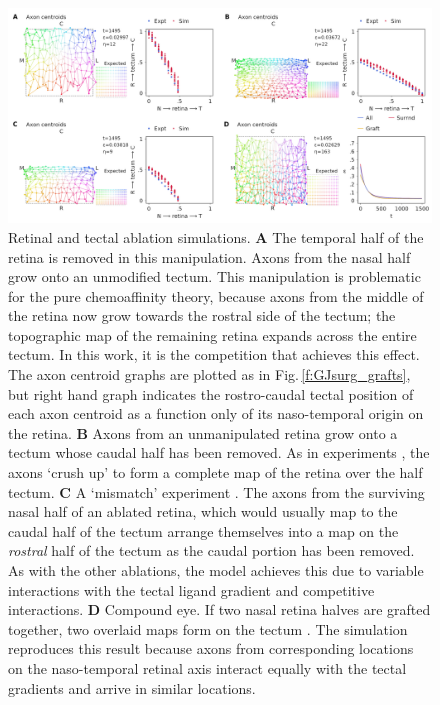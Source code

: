 \documentclass[9pt]{elife} %
\begin{document}
\begin{figure}
\begin{fullwidth}
\includegraphics[width=0.95\linewidth]{./images/fig_GJ_surgical_ablations.png}
\caption{Retinal and tectal ablation simulations. \textbf{A} The temporal half of the retina is removed in this manipulation. Axons from the nasal half grow onto an unmodified tectum. This manipulation is problematic for the pure chemoaffinity theory, because axons from the middle of the retina now grow towards the rostral side of the tectum; the topographic map of the remaining retina expands across the entire tectum. In this work, it is the competition that achieves this effect. The axon centroid graphs are plotted as in Fig.\,\ref{f:GJsurg_grafts}, but right hand graph indicates the rostro-caudal tectal position of each axon centroid as a function only of its naso-temporal origin on the retina. \textbf{B} Axons from an unmanipulated retina grow onto a tectum whose caudal half has been removed. As in experiments \citep{yoon_reorganization_1971,finlay_orderly_1979}, the axons `crush up' to form a complete map of the retina over the half tectum. \textbf{C} A `mismatch' experiment \citep{horder_retention_1971}. The axons from the surviving nasal half of an ablated retina, which would usually map to the caudal half of the tectum arrange themselves into a map on the \emph{rostral} half of the tectum as the caudal portion has been removed. As with the other ablations, the model achieves this due to variable interactions with the tectal ligand gradient and competitive interactions. \textbf{D} Compound eye. If two nasal retina halves are grafted together, two overlaid maps form on the tectum \citep{gaze_retino-tectal_1963}. The simulation reproduces this result because axons from corresponding locations on the naso-temporal retinal axis interact equally with the tectal gradients and arrive in similar locations.}
\label{f:GJsurg_ablate}
\end{fullwidth}
\end{figure}
\end{document}

